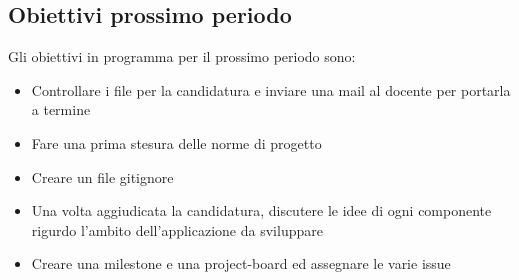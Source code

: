 \subsection{Obiettivi prossimo periodo}
Gli obiettivi in programma per il prossimo periodo sono:
\begin{itemize}
\item Controllare i file per la candidatura e inviare una mail al docente per portarla a termine
\item Fare una prima stesura delle norme di progetto
\item Creare un file gitignore
\item Una volta aggiudicata la candidatura, discutere le idee di ogni componente rigurdo l'ambito dell'applicazione da sviluppare
\item Creare una milestone e una project-board ed assegnare le varie issue
\end{itemize}

